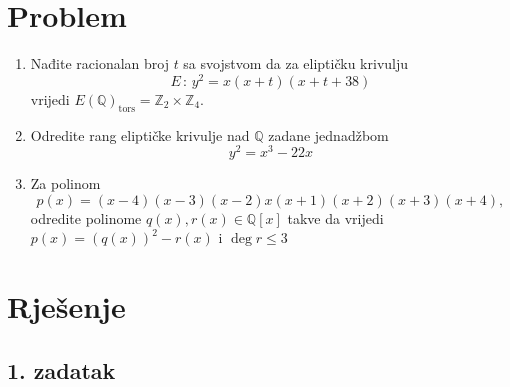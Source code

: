 \documentclass[12pt, a4paper]{article}
\begin{document}
\begin{spacing}{1.5}
\section{Problem}
\begin{enumerate}
\item Nađite racionalan broj $t$ sa svojstvom da za eliptičku krivulju 
\[E \, : \, y^2 =x(x+t)(x+t+38)\]
vrijedi $E(\mathbb{Q})_{\textrm{tors}}=\mathbb{Z}_2 \times \mathbb{Z}_4$.
\item Odredite rang eliptičke krivulje nad $\mathbb{Q}$ zadane jednadžbom
\[y^2=x^3-22x\]
\item Za polinom
\[p(x) = (x - 4)(x - 3)(x - 2)x(x + 1)(x + 2)(x + 3)(x + 4),\]
odredite polinome $q(x), r(x) \in \mathbb{Q}[x]$ takve da vrijedi $p(x)=(q(x))^2-r(x)$ i $\deg r \leq 3$
\end{enumerate}
\newpage
\section{Rješenje}
\subsection{1. zadatak}
\end{spacing}
\end{document}
